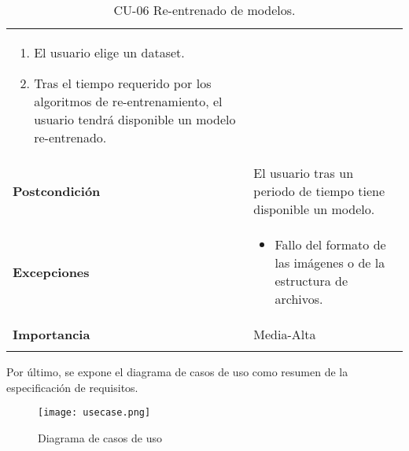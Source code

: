 \begin{longtable}[H]{@{}ll@{}}
\begin{minipage}[t]{0.68\columnwidth}
\begin{enumerate}
\def\labelenumi{\arabic{enumi}.}
\tightlist
\item
  El usuario elige un dataset.
\item
  Tras el tiempo requerido por los algoritmos de re-entrenamiento, el usuario tendrá disponible un modelo re-entrenado.
\end{enumerate}\strut
\end{minipage}\tabularnewline
\begin{minipage}[t]{0.26\columnwidth}\raggedright\strut
\textbf{Postcondición}\strut
\end{minipage} & \begin{minipage}[t]{0.68\columnwidth}\raggedright\strut%
El usuario tras un periodo de tiempo tiene disponible un modelo.\strut
\end{minipage}\tabularnewline
\begin{minipage}[t]{0.26\columnwidth}\raggedright\strut
\textbf{Excepciones}\strut
\end{minipage} & \begin{minipage}[t]{0.68\columnwidth}\raggedright\strut%
\begin{itemize}
\tightlist
\item
  Fallo del formato de las imágenes o de la estructura de archivos.
\end{itemize}\strut
\end{minipage}\tabularnewline
\begin{minipage}[t]{0.26\columnwidth}\raggedright\strut
\textbf{Importancia}\strut
\end{minipage} & \begin{minipage}[t]{0.68\columnwidth}\raggedright\strut%
Media-Alta\strut
\end{minipage}\tabularnewline
\bottomrule%
\caption{CU-06 Re-entrenado de modelos.}
\end{longtable}

\newpage
Por último, se expone el diagrama de casos de uso como resumen de la especificación de requisitos.
\FloatBarrier
\begin{figure}
	\centering
	\texttt{[image: usecase.png]}
	\caption{Diagrama de casos de uso}\label{fig:usecase.png}
\end{figure}


